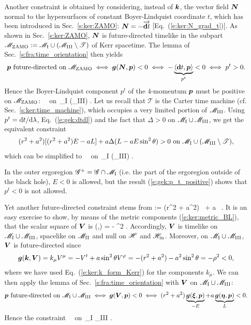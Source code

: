 Another constraint is obtained by considering, instead of $\bm{k}$, the
vector field $\bm{N}$ normal to the hypersurfaces of constant
Boyer-Lindquist coordinate $t$, which has been introduced in Sec.~\ref{s:ker:ZAMO}:
$\bm{N} = - \overrightarrow{\mathbf{d} t}$ [Eq.~(\ref{e:ker:N_grad_t})].
As shown in Sec.~\ref{s:ker:ZAMO}, $\bm{N}$ is future-directed timelike
in the subpart $\mathscr{M}_{\rm ZAMO} := \mathscr{M}_{\rm I} \cup (\mathscr{M}_{\rm III}\setminus \mathscr{T})$
of Kerr spacetime. The lemma of Sec.~\ref{s:fra:time_orientation}
then yields
\[
    \bm{p} \ \mbox{future-directed on} \ \mathscr{M}_{\rm ZAMO} \iff \bm{g}(\bm{N},\bm{p}) < 0
    \iff - \underbrace{\langle \mathbf{d} t, \bm{p} \rangle}_{p^t} < 0 \iff p^t > 0 .
\]
Hence the Boyer-Lindquist component $p^t$ of the 4-momentum $\bm{p}$ must be positive
on $\mathscr{M}_{\rm ZAMO}$:
\be \label{e:gek:p_t_positive}
     \ \ \mbox{on}\ \M_{\rm I} \cup (\M_{\rm III}\setminus {}) .
\ee
Let us recall that $\mathscr{T}$ is the Carter time machine (cf. Sec.~\ref{s:ker:time_machine}),
which occupies a very limited portion of $\mathscr{M}_{\rm III}$.
Using $p^t = \mathrm{d} t/\mathrm{d}\lambda$, Eq.~(\ref{e:gek:dtdl}) and the fact that $\Delta > 0$
on $\mathscr{M}_{\rm I} \cup \mathscr{M}_{\rm III}$, we get the equivalent
constraint
\[
    (r^2 + a^2) [(r^2 + a^2) E - a L]  + a \Delta ( L - a E \sin^2\theta ) > 0
      \ \mbox{on}\ \mathscr{M}_{\rm I} \cup (\mathscr{M}_{\rm III}\setminus \mathscr{T}) ,
\]
which can be simplified to
\be
{}
\ \ \mbox{on}\ \M_{\rm I} \cup (\M_{\rm III}\setminus {}) .
\ee

\begin{remark}
In the outer ergoregion  $\mathscr{G}^+ = \mathscr{G}\cap \mathscr{M}_{\rm I}$
(i.e. the part of the ergoregion outside of the black hole),
$E<0$ is allowed, but the result
(\ref{e:gek:p_t_positive}) shows that $p^t < 0$ is not allowed.
\end{remark}

Yet another future-directed constraint stems from
 \cite{ONeil95}
\be
     := (r^2 + a^2) \, \w{\xi} + a \, \w{\eta} .
\ee
It is an easy exercise to show, by means of the metric components (\ref{e:ker:metric_BL}), that the scalar
square of $\bm{V}$ is
\be
    (,) = - \rho^2 \Delta .
\ee
Accordingly, $\bm{V}$ is timelike on $\mathscr{M}_{\rm I} \cup \mathscr{M}_{\rm III}$, spacelike on $\mathscr{M}_{\rm II}$
and null on $\mathscr{H}$ and $\mathscr{H}_{\rm in}$. Moreover, on $\mathscr{M}_{\rm I} \cup \mathscr{M}_{\rm III}$,
$\bm{V}$ is future-directed since
\[
    \bm{g}(\bm{k},\bm{V}) = k_\mu V^\mu = - V^t  + a\sin^2\theta V^\varphi = - (r^2 + a^2) - a^2\sin^2\theta = - \rho^2 < 0 ,
\]
where we have used Eq.~(\ref{e:ker:k_form_Kerr}) for the components $k_\mu$.
We can then apply the lemma of Sec.~\ref{s:fra:time_orientation} with $\bm{V}$
on $\mathscr{M}_{\rm I} \cup \mathscr{M}_{\rm III}$:
\[
   \bm{p} \ \mbox{future-directed on} \ \mathscr{M}_{\rm I} \cup \mathscr{M}_{\rm III} \iff \bm{g}(\bm{V},\bm{p}) < 0
   \iff (r^2 + a^2) \underbrace{\bm{g}(\bm{\xi}, \bm{p})}_{-E} + a \underbrace{\bm{g}(\bm{\eta}, \bm{p})}_{L} < 0 .
\]
Hence the constraint
\be
     \ \ \mbox{on}\ \M_{\rm I} \cup \M_{\rm III} .
\ee

